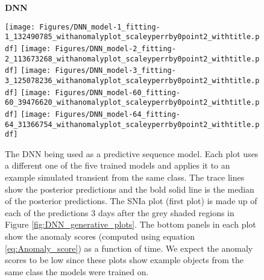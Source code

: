 \documentclass[fleqn,usenatbib]{mnras}
\begin{document}
\begin{figure*}
    \textbf{DNN}\par\medskip
    \vspace{-0.5em}
    \centering
        {\texttt{[image: Figures/DNN\_model-1\_fitting-1\_132490785\_withanomalyplot\_scaleyperrby0point2\_withtitle.pdf]}}
        {\texttt{[image: Figures/DNN\_model-2\_fitting-2\_113673268\_withanomalyplot\_scaleyperrby0point2\_withtitle.pdf]}}
        {\texttt{[image: Figures/DNN\_model-3\_fitting-3\_125078236\_withanomalyplot\_scaleyperrby0point2\_withtitle.pdf]}}
        {\texttt{[image: Figures/DNN\_model-60\_fitting-60\_39476620\_withanomalyplot\_scaleyperrby0point2\_withtitle.pdf]}}
        {\texttt{[image: Figures/DNN\_model-64\_fitting-64\_31366754\_withanomalyplot\_scaleyperrby0point2\_withtitle.pdf]}}
    \caption{The DNN being used as a predictive sequence model. Each plot uses a different one of the five trained models and applies it to an example simulated transient from the same class. The trace lines show the posterior predictions and the bold solid line is the median of the posterior predictions. The SNIa plot (first plot) is made up of each of the predictions 3 days after the grey shaded regions in Figure \ref{fig:DNN_generative_plots}. The bottom panels in each plot show the anomaly scores (computed using equation \ref{eq:Anomaly_score}) as a function of time. We expect the anomaly scores to be low since these plots show example objects from the same class the models were trained on.}
        \label{fig:DNN_predictive_plots}
\end{figure*}
\end{document}
